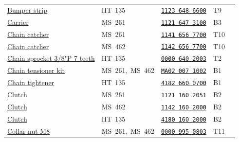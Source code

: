\documentclass[10pt,letterpaper]{article}
\begin{document}
\begin{longtable}{@{}>{\raggedright\arraybackslash}p{3.18in}p{1.85in}p{1.30in}p{0.38in}r@{}}
\hyperlink{11236486600}{Bumper strip} & \textcolor{frkApplication}{\mbox{HT 135}} & \hyperlink{11236486600}{\texttt{1123 648 6600}} & T9 & \pageref{part-11236486600}\\

\rowcolor{black!6}\hyperlink{11216473100}{Carrier} & \textcolor{frkApplication}{\mbox{MS 261}} & \hyperlink{11216473100}{\texttt{1121 647 3100}} & B3 & \pageref{part-11216473100}\\

\hyperlink{11416567700}{Chain catcher} & \textcolor{frkApplication}{\mbox{MS 261}} & \hyperlink{11416567700}{\texttt{1141 656 7700}} & T10 & \pageref{part-11416567700}\\

\rowcolor{black!6}\hyperlink{11426567700}{Chain catcher} & \textcolor{frkApplication}{\mbox{MS 462}} & \hyperlink{11426567700}{\texttt{1142 656 7700}} & T10 & \pageref{part-11426567700}\\

\hyperlink{00006402003}{Chain sprocket 3/8"P 7 teeth} & \textcolor{frkApplication}{\mbox{HT 135}} & \hyperlink{00006402003}{\texttt{0000 640 2003}} & T2 & \pageref{part-00006402003}\\

\rowcolor{black!6}\hyperlink{ma020071002}{Chain tensioner kit} & \textcolor{frkApplication}{\mbox{MS 261, MS 462}} & \hyperlink{ma020071002}{\texttt{MA02 007 1002}} & B1 & \pageref{part-ma020071002}\\

\hyperlink{41826600700}{Chain tightener} & \textcolor{frkApplication}{\mbox{HT 135}} & \hyperlink{41826600700}{\texttt{4182 660 0700}} & B1 & \pageref{part-41826600700}\\

\rowcolor{black!6}\hyperlink{11211602051}{Clutch} & \textcolor{frkApplication}{\mbox{MS 261}} & \hyperlink{11211602051}{\texttt{1121 160 2051}} & B2 & \pageref{part-11211602051}\\

\hyperlink{11421602000}{Clutch} & \textcolor{frkApplication}{\mbox{MS 462}} & \hyperlink{11421602000}{\texttt{1142 160 2000}} & B2 & \pageref{part-11421602000}\\

\rowcolor{black!6}\hyperlink{41801602000}{Clutch} & \textcolor{frkApplication}{\mbox{HT 135}} & \hyperlink{41801602000}{\texttt{4180 160 2000}} & B2 & \pageref{part-41801602000}\\

\hyperlink{00009950803}{Collar nut M8} & \textcolor{frkApplication}{\mbox{MS 261, MS 462}} & \hyperlink{00009950803}{\texttt{0000 995 0803}} & T11 & \pageref{part-00009950803}\\


\end{longtable}
\end{document}
